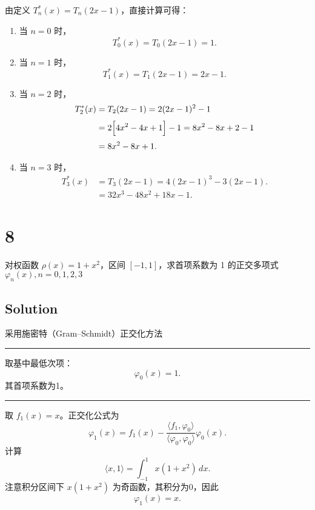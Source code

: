 \documentclass[11pt]{article}
\begin{document}
由定义 \(T^*_n(x)=T_n(2x-1)\)，直接计算可得：

\begin{enumerate}
\def\labelenumi{\arabic{enumi}.}
\item
  当 \(n=0\) 时， \[
  T^*_0(x)=T_0(2x-1)=1.
  \]
\item
  当 \(n=1\) 时， \[
  T^*_1(x)=T_1(2x-1)=2x-1.
  \]
\item
  当 \(n=2\) 时， \[
  \begin{aligned}
  T^*_2(x)&=T_2(2x-1)=2(2x-1)^2-1\\[1mm]
  &=2\Bigl[4x^2-4x+1\Bigr]-1=8x^2-8x+2-1\\[1mm]
  &=8x^2-8x+1.
  \end{aligned}
  \]
\item
  当 \(n=3\) 时， \[
  \begin{aligned}
  T^*_3(x)&=T_3(2x-1)=4(2x-1)^3-3(2x-1).\\[1mm]
  &=32x^3-48x^2+18x-1.
  \end{aligned}
  \]
\end{enumerate}

    \section{8}\label{section}

对权函数 \(\rho (x) = 1 + x^2\)，区间 \([-1, 1]\)，求首项系数为 1
的正交多项式 \(\varphi_n(x), n = 0,1,2,3\)

    \subsection{Solution}\label{solution}

采用施密特（Gram--Schmidt）正交化方法

\begin{center}\rule{0.5\linewidth}{0.5pt}\end{center}

取基中最低次项： \[
\varphi_0(x)=1.
\] 其首项系数为1。

\begin{center}\rule{0.5\linewidth}{0.5pt}\end{center}

取 \(f_1(x)=x\)。正交化公式为 \[
\varphi_1(x)=f_1(x)-\frac{\langle f_1, \varphi_0\rangle}{\langle \varphi_0,\varphi_0\rangle}\varphi_0(x).
\] 计算 \[
\langle x,1\rangle=\int_{-1}^{1}x(1+x^2)\,dx.
\] 注意积分区间下 \(x(1+x^2)\) 为奇函数，其积分为0，因此 \[
\varphi_1(x)=x.
\]
\end{document}
